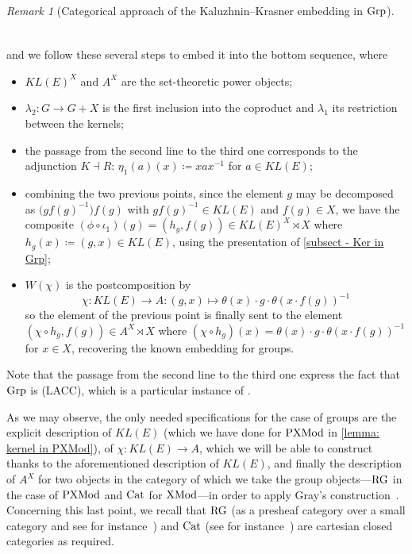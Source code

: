 \documentclass[a4paper, british, reqno]{amsart}
\newcommand*{\comp}{\circ}
\newcommand*{\from}{\colon}
\newcommand*{\eqdef}{\coloneq}
\newcommand*{\adj}{\dashv}
\newcommand*{\mapping}{\colon}
\newcommand*{\CatName}[1]{\textnormal{#1}}
\newcommand*{\CondName}[1]{\textnormal{(#1)}}
\newcommand*{\Grp}{\CatName{Grp}}
\newcommand*{\PXMod}{\CatName{PXMod}}
\newcommand*{\XMod}{\CatName{XMod}}
\newcommand*{\RG}{\CatName{RG}}
\newcommand*{\Cat}{\CatName{Cat}}
\newcommand*{\LACC}{\CondName{LACC}}
\theoremstyle{definition}
\theoremstyle{remark}
\newtheorem{remark}[theorem]{Remark}
\begin{document}
\begin{remark}[Categorical approach of the Kaluzhnin--Krasner embedding in \(\Grp\)]
\begin{equation}
\begin{tikzcd}
		\end{tikzcd}
	\end{equation}
	and we follow these several steps to embed it into the bottom sequence, where
	\begin{itemize}
		\item \(KL(E)^X\) and \(A^X\) are the set-theoretic power objects;
		\item \(\lambda_2 \from G \to G+X\) is the first inclusion into the coproduct and \(\lambda_1\) its restriction between the kernels;
		\item the passage from the second line to the third one corresponds to the adjunction \(K \adj R\): \(\eta_1(a)(x) \eqdef xax^{-1}\) for \(a \in KL(E)\);
		\item combining the two previous points, since the element \(g\) may be decomposed as \(\bigl(gf(g)^{-1}\bigr) f(g)\) with \(gf(g)^{-1} \in KL(E)\) and \(f(g) \in X\), we have the composite \((\phi \comp \iota_1)(g) = (h_g,f(g))\in KL(E)^X\rtimes X\) where \(h_g(x) \eqdef (g,x)\in KL(E)\), using the presentation of \cref{subsect - Ker in Grp};
		\item \(W(\chi)\) is the postcomposition by
		      \[
			      \chi\colon KL(E) \to A \mapping (g,x)\mapsto \theta(x)\cdot g\cdot  \theta(x\cdot f(g))^{-1}
		      \]
		      so the element of the previous point is finally sent to the element \((\chi \comp h_g , f(g)) \in A^X\rtimes X\) where \((\chi \comp h_g)(x) = \theta(x)\cdot g\cdot  \theta(x\cdot f(g))^{-1}\) for \(x \in X\), recovering the known embedding for groups.
	\end{itemize}
	Note that the passage from the second line to the third one express the fact that \(\Grp\) is \LACC{}\@, which is a particular instance of \cite[Proposition~5.3]{Gra12}.

	As we may observe, the only needed specifications for the case of groups are the explicit description of \(KL(E)\) (which we have done for \(\PXMod\) in \cref{lemma: kernel in PXMod}), of \(\chi\colon KL(E)\to A\), which we will be able to construct thanks to the aforementioned description of \(KL(E)\), and finally the description of \(A^X\) for two objects in the category of which we take the group objects---\(\RG\) in the case of \(\PXMod\) and \(\Cat\) for \(\XMod\)---in order to apply Gray's construction~\cite[Proposition~5.3]{Gra12}.
	Concerning this last point, we recall that \(\RG\) (as a presheaf category  over a small category and see for instance~\cite[Theorem~2.3.4]{Bor94d}) and \(\Cat\) (see for instance~\cite{MLan98}) are cartesian closed categories as required.
\end{remark}
\end{document}
